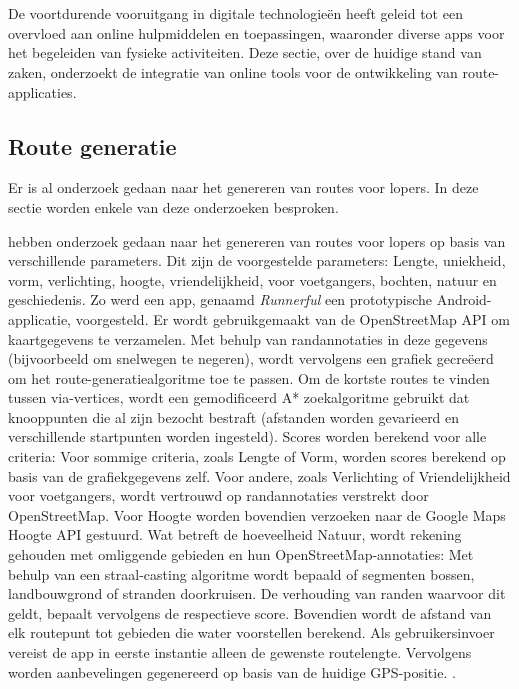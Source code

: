 \chapter{}%
\label{ch:stand-van-zaken}



De voortdurende vooruitgang in digitale technologieën heeft geleid tot een overvloed aan online hulpmiddelen en toepassingen,
waaronder diverse apps voor het begeleiden van fysieke activiteiten.
Deze sectie, over de huidige stand van zaken, onderzoekt de integratie van online tools voor de ontwikkeling van route-applicaties.

    \section{Route generatie}

    Er is al onderzoek gedaan naar het genereren van routes voor lopers. In deze sectie worden enkele van deze onderzoeken besproken.
    
    \textcite{Loepp2018} hebben onderzoek gedaan naar het genereren van routes voor lopers op basis van verschillende parameters.
    Dit zijn de voorgestelde parameters: Lengte, uniekheid, vorm, verlichting, hoogte, vriendelijkheid, voor voetgangers, bochten, natuur en geschiedenis.
    Zo werd een app, genaamd \emph{Runnerful} een prototypische Android-applicatie, voorgesteld. Er wordt gebruikgemaakt van de OpenStreetMap API om kaartgegevens te verzamelen. 
    Met behulp van randannotaties in deze gegevens (bijvoorbeeld om snelwegen te negeren), 
    wordt vervolgens een grafiek gecreëerd om het route-generatiealgoritme toe te passen.
    Om de kortste routes te vinden tussen via-vertices, wordt een gemodificeerd A* zoekalgoritme gebruikt dat knooppunten 
    die al zijn bezocht bestraft (afstanden worden gevarieerd en verschillende startpunten worden ingesteld). 
    Scores worden berekend voor alle criteria: Voor sommige criteria, zoals Lengte of Vorm, worden scores berekend op basis van de grafiekgegevens zelf. 
    Voor andere, zoals Verlichting of Vriendelijkheid voor voetgangers, wordt vertrouwd op randannotaties verstrekt door OpenStreetMap. 
    Voor Hoogte worden bovendien verzoeken naar de Google Maps Hoogte API gestuurd. Wat betreft de hoeveelheid Natuur, wordt rekening gehouden met omliggende gebieden en hun OpenStreetMap-annotaties:
    Met behulp van een straal-casting algoritme wordt bepaald of segmenten bossen, landbouwgrond of stranden doorkruisen. De verhouding van randen waarvoor dit geldt, 
    bepaalt vervolgens de respectieve score. Bovendien wordt de afstand van elk routepunt tot gebieden die water voorstellen berekend. 
    Als gebruikersinvoer vereist de app in eerste instantie alleen de gewenste routelengte. 
    Vervolgens worden aanbevelingen gegenereerd op basis van de huidige GPS-positie. 
     \autocite{Loepp2018}.

